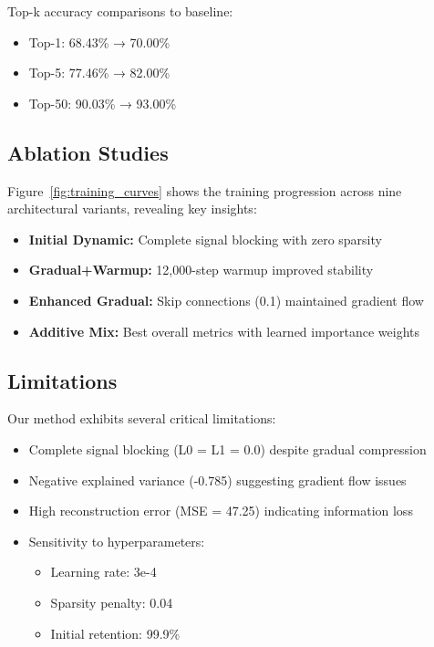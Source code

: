 \documentclass{article} %
\begin{document}
Top-k accuracy comparisons to baseline:
\begin{itemize}
    \item Top-1: 68.43\% → 70.00\%
    \item Top-5: 77.46\% → 82.00\%
    \item Top-50: 90.03\% → 93.00\%
\end{itemize}

\subsection{Ablation Studies}

Figure~\ref{fig:training_curves} shows the training progression across nine architectural variants, revealing key insights:

\begin{itemize}
    \item \textbf{Initial Dynamic:} Complete signal blocking with zero sparsity
    \item \textbf{Gradual+Warmup:} 12,000-step warmup improved stability
    \item \textbf{Enhanced Gradual:} Skip connections (0.1) maintained gradient flow
    \item \textbf{Additive Mix:} Best overall metrics with learned importance weights
\end{itemize}

\subsection{Limitations}

Our method exhibits several critical limitations:

\begin{itemize}
    \item Complete signal blocking (L0 = L1 = 0.0) despite gradual compression
    \item Negative explained variance (-0.785) suggesting gradient flow issues
    \item High reconstruction error (MSE = 47.25) indicating information loss
    \item Sensitivity to hyperparameters:
    \begin{itemize}
        \item Learning rate: 3e-4
        \item Sparsity penalty: 0.04
        \item Initial retention: 99.9\%
    \end{itemize}
\end{itemize}
\end{document}
